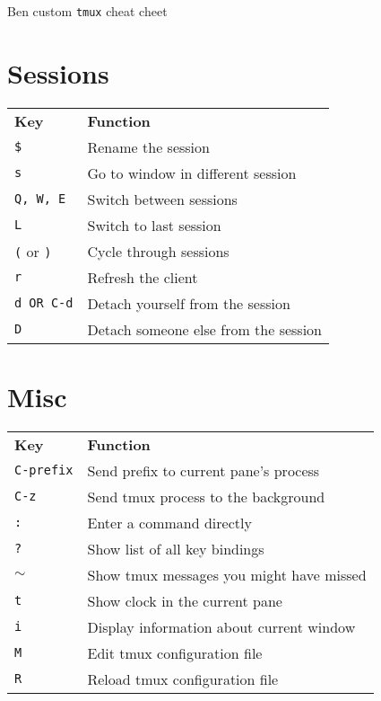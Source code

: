 \documentclass[landscape]{article}
\newcommand{\thead}[1]{{\color{black}\bf#1}}
\newcommand{\blankfirst}{%
  \ifodd\rownum\advance\rownum1\relax\fi}
\begin{document}
\thispagestyle{empty}
\begin{center}
  \Huge Ben custom \texttt{tmux} cheat cheet %
\end{center}

\begin{multicols}{3}
  \small
  \section*{Sessions}
  \blankfirst
  \noindent\begin{tabular}{p{0.6in}p{2.3in}} %
    \thead{Key} & \thead{Function}\\
    \verb|$| & Rename the session\\
    \verb|s| & Go to window in different session\\
    \verb|Q, W, E| & Switch between sessions\\
    \verb|L| & Switch to last session\\
    \verb|(| or \verb|)| & Cycle through sessions\\
    \verb|r| & Refresh the client\\
    \verb|d OR C-d| & Detach yourself from the session\\
    \verb|D| & Detach someone else from the session\\
  \end{tabular}

  \section*{Misc}
  \blankfirst
  \noindent\begin{tabular}{p{0.6in}p{2.3in}} %
    \thead{Key} & \thead{Function}\\
    \verb|C-prefix| & Send prefix to current pane's process\\
    \verb|C-z| & Send tmux process to the background\\
    \verb|:| & Enter a command directly\\
    \verb|?| & Show list of all key bindings\\
    $\mathtt \sim$ & Show tmux messages you might have missed\\
    \verb|t| & Show clock in the current pane\\
    \verb|i| & Display information about current window\\
    \verb|M| & Edit tmux configuration file\\
    \verb|R| & Reload tmux configuration file\\
  \end{tabular}  


\end{multicols}
\end{document}
